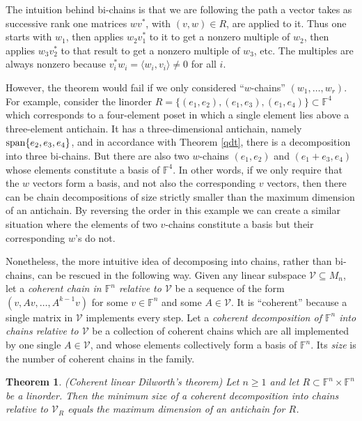 \documentclass{amsart}
\newtheorem{thm}{Theorem}[section]
\theoremstyle{definition}
\begin{document}
The intuition behind bi-chains is that we are following the path a vector takes as successive rank one matrices $wv^*$, with $(v,w) \in R$, are applied to it. Thus one starts with $w_1$, then applies $w_2v_1^*$ to it to get a nonzero multiple of $w_2$, then applies $w_3v_2^*$ to that result to get a nonzero multiple of $w_3$, etc. The multiples are always nonzero because $v_i^*w_i = \langle w_i, v_i\rangle \neq 0$ for all $i$.

However, the theorem would fail if we only considered ``$w$-chains'' $(w_1, \ldots, w_r)$. For example, consider the linorder $R = \{(e_1, e_2), (e_1, e_3), (e_1, e_4)\} \subset \mathbb{F}^4$ which corresponds to a four-element poset in which a single element lies above a three-element antichain. It has a three-dimensional antichain, namely ${\rm span}\{e_2, e_3, e_4\}$, and in accordance with Theorem \ref{qdt}, there is a decomposition into three bi-chains. But there are also two $w$-chains $(e_1, e_2)$ and $(e_1 + e_3, e_4)$ whose elements constitute a basis of $\mathbb{F}^4$. In other words, if we only require that the $w$ vectors form a basis, and not also the corresponding $v$ vectors, then there can be chain decompositions of size strictly smaller than the maximum dimension of an antichain. By reversing the order in this example we can create a similar situation where the elements of two $v$-chains constitute a basis but their corresponding $w$'s do not.

Nonetheless, the more intuitive idea of decomposing into chains, rather than bi-chains, can be rescued in the following way. Given any linear subspace $\mathcal{V} \subseteq M_n$, let a {\it coherent chain in $\mathbb{F}^n$ relative to $\mathcal{V}$} be a sequence of the form $(v, Av, \ldots, A^{k-1} v)$ for some $v \in \mathbb{F}^n$ and some $A \in \mathcal{V}$. It is ``coherent'' because a single matrix in $\mathcal{V}$ implements every step. Let a {\it coherent decomposition of $\mathbb{F}^n$ into chains relative to $\mathcal{V}$} be a collection of coherent chains which are all implemented by one single $A \in \mathcal{V}$, and whose elements collectively form a basis of $\mathbb{F}^n$. Its {\it size} is the number of coherent chains in the family.

\begin{thm}\label{cqdt} (Coherent linear Dilworth's theorem)
Let $n \geq 1$ and let $R \subset \mathbb{F}^n\times \mathbb{F}^n$ be a linorder. Then the minimum size of a coherent decomposition into chains relative to $\mathcal{V}_R$ equals the maximum dimension of an antichain for $R$.
\end{thm}
\end{document}
